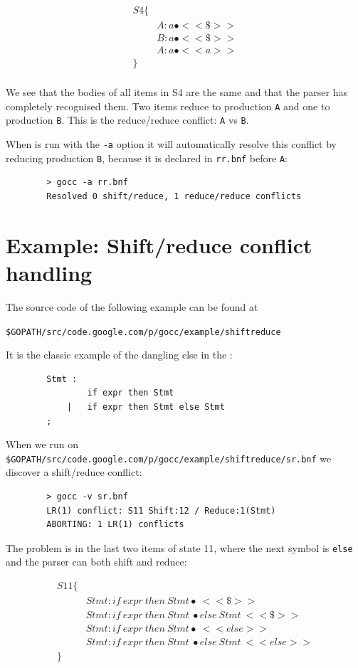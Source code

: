 \documentclass[12pt]{article}
\begin{document}
	\[
		\begin{array}{ll}
			S4 \{ \\
			    & A : a\bullet  <<\$>> \\
			    & B : a\bullet  <<\$>> \\
			    & A : a\bullet  <<a>> \\
			\} \\
		\end{array}
	\]

	We see that the bodies of all items in S4 are the same and that the parser has completely recognised them. Two items reduce to production \verb|A| and one to production \verb|B|. This is the reduce/reduce conflict: \verb|A| vs \verb|B|.

	When \gocc is run with the \verb|-a| option it will automatically resolve this conflict by reducing production \verb|B|, because it is declared in \verb|rr.bnf| before \verb|A|:

	\begin{verbatim}
		> gocc -a rr.bnf
		Resolved 0 shift/reduce, 1 reduce/reduce conflicts
	\end{verbatim}

\section{Example: Shift/reduce conflict handling} \label{sec:example sr}
	The source code of the following example can be found at

	\verb|$GOPATH/src/code.google.com/p/gocc/example/shiftreduce|

	It is the classic example of the dangling else in the \Clang:

	\begin{verbatim}
		Stmt :
		        if expr then Stmt
		    |   if expr then Stmt else Stmt
		;
	\end{verbatim}

	When we run \gocc on \verb|$GOPATH/src/code.google.com/p/gocc/example/shiftreduce/sr.bnf| we discover a shift/reduce conflict:

	\begin{verbatim}
		> gocc -v sr.bnf
		LR(1) conflict: S11 Shift:12 / Reduce:1(Stmt)
		ABORTING: 1 LR(1) conflicts
	\end{verbatim}

	The problem is in the last two items of state 11, where the next symbol is \verb|else| and the parser can both shift and reduce:

	\[
		\begin{array}{ll}
			S11 \{ \\
			  & Stmt : if\ expr\ then\ Stmt\bullet\ <<\$>> \\
			  & Stmt : if\ expr\ then\ Stmt\ \bullet else\ Stmt\ <<\$>> \\
			  & Stmt : if\ expr\ then\ Stmt \bullet\ <<else>> \\
			  & Stmt : if\ expr\ then\ Stmt\ \bullet else\ Stmt\ <<else>> \\
			\} \\
		\end{array}
	\]
\end{document}
